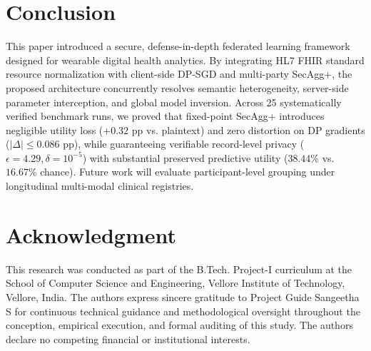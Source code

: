 \documentclass[journal,twocolumn,10pt]{IEEEtran}
\begin{document}
\section{Conclusion}
This paper introduced a secure, defense-in-depth federated learning framework designed for wearable digital health analytics. By integrating HL7 FHIR standard resource normalization with client-side DP-SGD and multi-party SecAgg+, the proposed architecture concurrently resolves semantic heterogeneity, server-side parameter interception, and global model inversion. Across 25 systematically verified benchmark runs, we proved that fixed-point SecAgg+ introduces negligible utility loss ($+0.32$ pp vs. plaintext) and zero distortion on DP gradients ($|\Delta| \le 0.086$ pp), while guaranteeing verifiable record-level privacy ($\epsilon = 4.29, \delta = 10^{-5}$) with substantial preserved predictive utility ($38.44\%$ vs. $16.67\%$ chance). Future work will evaluate participant-level grouping under longitudinal multi-modal clinical registries.

\section*{Acknowledgment}
This research was conducted as part of the B.Tech. Project-I curriculum at the School of Computer Science and Engineering, Vellore Institute of Technology, Vellore, India. The authors express sincere gratitude to Project Guide Sangeetha S for continuous technical guidance and methodological oversight throughout the conception, empirical execution, and formal auditing of this study. The authors declare no competing financial or institutional interests.

\balance


\end{document}
